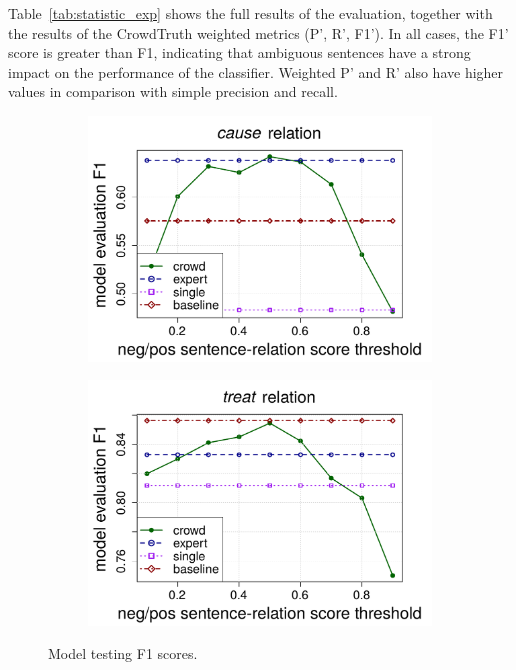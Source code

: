 Table~\ref{tab:statistic_exp} shows the full results of the evaluation, together with the results of the CrowdTruth weighted metrics (P', R', F1'). In all cases, the F1' score is greater than F1, indicating that ambiguous sentences have a strong impact on the performance of the classifier. Weighted P' and R' also have higher values in comparison with simple precision and recall.

\begin{figure}[htb!]
\centering
\begin{subfigure}{.5\textwidth}
\includegraphics[width=\linewidth]{img/cause_expert.pdf}
\end{subfigure}%
\begin{subfigure}{.5\textwidth}
\includegraphics[width=\linewidth]{img/treat_expert.pdf}
\end{subfigure}
\caption{Model testing F1 scores.}
\label{fig:exp_f1}
\end{figure}

